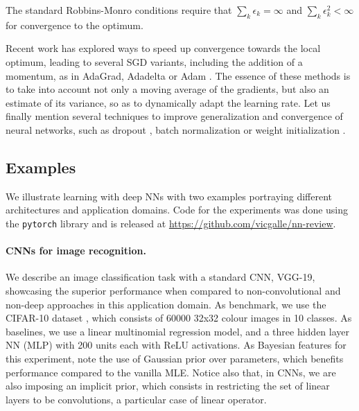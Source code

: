 \noindent The standard Robbins-Monro conditions require
that $\sum _k \epsilon_k = \infty$ and 
$\sum _k \epsilon _k^2 < \infty $ for convergence to the optimum.

Recent work has explored ways to 
speed up convergence towards the local optimum, 
leading to several SGD variants, including the 
 addition of a momentum, as in AdaGrad, Adadelta or Adam \parencite{kingma2014adam,duchi2011adaptive,zeiler2012adadelta}. The essence of these methods is to take into account not only a moving average of the gradients, but also an estimate of its variance, so as to dynamically adapt the learning rate. 
Let us finally mention 
several techniques to improve generalization and convergence of neural networks, such as dropout \parencite{srivastava2014dropout}, batch normalization \parencite{ioffe2015batch} or weight initialization \parencite{glorot2010understanding}.



\subsection{Examples}\label{sec:nn_examples}
We illustrate learning with deep NNs with two examples portraying
different architectures and application domains. Code for the experiments was done using the \texttt{pytorch} library \parencite{paszke2017automatic} and is released at \url{https://github.com/vicgalle/nn-review}.

\paragraph{CNNs for image recognition.}\label{kkvision}

We describe an image classification task with a standard CNN, VGG-19, showcasing the superior performance when compared to non-convolutional and non-deep approaches in this application domain. As benchmark, we use the CIFAR-10 dataset \parencite{krizhevsky2014cifar},
which consists of 60000 32x32 colour images in 10 classes. As baselines, we use a linear multinomial regression model, and a three hidden layer NN (MLP) with 200 units each with ReLU activations.  {As Bayesian features for this experiment, note the use of Gaussian prior over parameters, which benefits performance compared to the vanilla MLE. Notice also that, in CNNs, we are also imposing an implicit prior, which consists in restricting the set of linear layers to be convolutions, a particular case of linear operator.}

